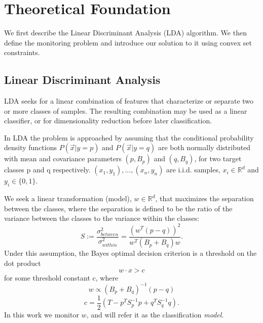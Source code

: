 \documentclass{sig-alternate-05-2015}
\begin{document}
\section{Theoretical Foundation}
We first describe the Linear Discriminant Analysis (LDA) algorithm.
We then define the monitoring problem and introduce our solution to it
using convex set constraints.

\subsection{Linear Discriminant Analysis}%
LDA seeks for a linear combination of features that characterize or separate two or more classes of samples.
The resulting combination may be used as a linear classifier, or for dimensionality reduction before later classification.

In LDA the problem is approached by assuming that the conditional probability
density functions $P(\vec x|y=p)$ and $P(\vec x|y=q)$ are both normally distributed with
mean and covariance parameters $(p, B_p)$ and
$(q, B_q)$, for two target classes p and q respectively.
${(x_1,y_1),\ldots,(x_n,y_n)}$ are i.i.d. samples, $x_i \in \mathbb{R}^d$
and $y_i \in \{0,1\}$.

We seek a linear transformation (model), $w \in \mathbb{R}^d $,
that maximizes the separation between the classes, where the separation is
defined to be the ratio of the variance between the classes to the variance
within the classes:
\begin{equation*}
S := \frac{\sigma^2_{between}}{\sigma^2_{within}} = \frac{(w^T (p -
q))^2}{w^T(B_p+B_q)w}.
\end{equation*}
Under this assumption, the Bayes optimal decision criterion is a threshold on the
dot product
\begin{equation*} \label{eq:decision}
w \cdot x > c
\end{equation*}
for some threshold constant c, where
\begin{equation} \label{eq:w}
w \propto (B_p+B_q)^{-1}(p - q)
\end{equation}
\begin{equation} \label{eq:c}
c = \frac{1}{2}(T-{p}^T S_p^{-1} {p}+{q}^T S_q^{-1} {q}).
\end{equation}
In this work we monitor $w$, and will refer it as the
classification \textit{model}.
\end{document}
